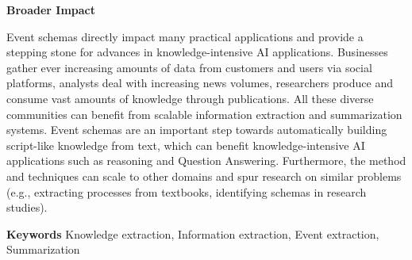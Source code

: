 \documentclass[a4paper,11pt,onecolumn]{article}
\begin{document}
{\bf Broader Impact} 

Event schemas directly impact many practical applications and provide a stepping stone for advances in knowledge-intensive AI applications. Businesses gather ever increasing amounts of data from customers and users via social platforms, analysts deal with increasing news volumes, researchers produce and consume vast amounts of knowledge through publications. All these diverse communities can benefit from scalable information extraction and summarization systems. Event schemas are an important step towards automatically building script-like knowledge from text, which can benefit knowledge-intensive AI applications such as reasoning and Question Answering. Furthermore, the method and techniques can scale to other domains and spur research on similar problems (e.g., extracting processes from textbooks, identifying schemas in research studies).

{\bf Keywords} Knowledge extraction, Information extraction, Event extraction, Summarization
\end{document}
